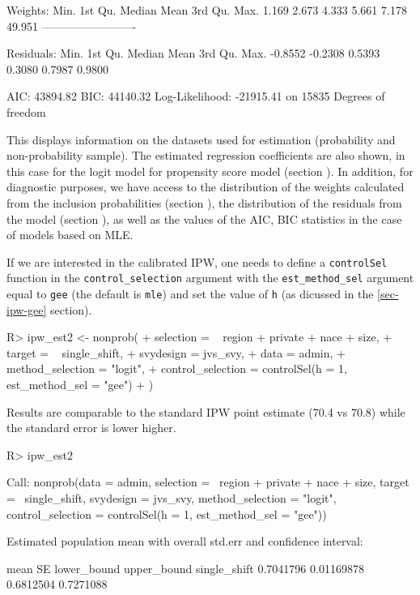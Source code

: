 \documentclass[
]{jss}
\begin{document}
\begin{CodeChunk}
\begin{CodeOutput}
Weights:
   Min. 1st Qu.  Median    Mean 3rd Qu.    Max. 
  1.169   2.673   4.333   5.661   7.178  49.951 
-------------------------

Residuals:
   Min. 1st Qu.  Median    Mean 3rd Qu.    Max. 
-0.8552 -0.2308  0.5393  0.3080  0.7987  0.9800 

AIC: 43894.82
BIC: 44140.32
Log-Likelihood: -21915.41 on 15835 Degrees of freedom
\end{CodeOutput}
\end{CodeChunk}

This displays information on the datasets used for estimation
(probability and non-probability sample). The estimated regression
coefficients are also shown, in this case for the logit model for
propensity score model (section ). In
addition, for diagnostic purposes, we have access to the distribution of
the weights calculated from the inclusion probabilities (section
), the distribution of the residuals from the model
(section ), as well as the values of the AIC, BIC
statistics in the case of models based on MLE.

If we are interested in the calibrated IPW, one needs to define a
\texttt{controlSel} function in the \texttt{control\_selection} argument
with the \texttt{est\_method\_sel} argument equal to \texttt{gee} (the
default is \texttt{mle}) and set the value of \texttt{h} (as dicussed in
the \ref{sec-ipw-gee} section).

\begin{CodeChunk}
\begin{CodeInput}
R> ipw_est2 <- nonprob(
+   selection = ~ region + private + nace + size,
+   target = ~ single_shift,
+   svydesign = jvs_svy,
+   data = admin,
+   method_selection = "logit",
+   control_selection = controlSel(h = 1, est_method_sel = "gee")
+ )
\end{CodeInput}
\end{CodeChunk}

Results are comparable to the standard IPW point estimate (70.4 vs 70.8)
while the standard error is lower higher.

\begin{CodeChunk}
\begin{CodeInput}
R> ipw_est2
\end{CodeInput}
\begin{CodeOutput}

Call:
nonprob(data = admin, selection = ~region + private + nace + 
    size, target = ~single_shift, svydesign = jvs_svy, method_selection = "logit", 
    control_selection = controlSel(h = 1, est_method_sel = "gee"))

Estimated population mean with overall std.err and confidence interval:

                  mean         SE lower_bound upper_bound
single_shift 0.7041796 0.01169878   0.6812504   0.7271088
\end{CodeOutput}
\end{CodeChunk}
\end{document}
